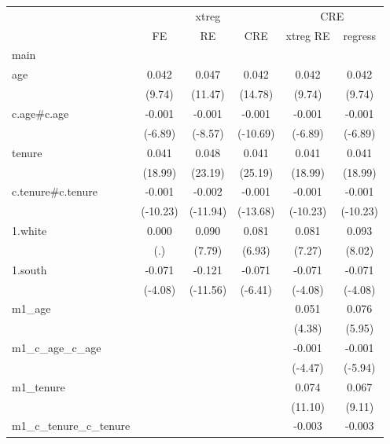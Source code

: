 
\begin{tabular}{l*{5}{c}}
\hline\hline
&\multicolumn{3}{c}{xtreg}&\multicolumn{2}{c}{CRE}\\
 & FE& RE& CRE &xtreg RE& regress\\

\hline
main        &            &            &            &            &            \\
age         &       0.042&       0.047&       0.042&       0.042&       0.042\\
            &      (9.74)&     (11.47)&     (14.78)&      (9.74)&      (9.74)\\
c.age\#c.age &      -0.001&      -0.001&      -0.001&      -0.001&      -0.001\\
            &     (-6.89)&     (-8.57)&    (-10.69)&     (-6.89)&     (-6.89)\\
tenure      &       0.041&       0.048&       0.041&       0.041&       0.041\\
            &     (18.99)&     (23.19)&     (25.19)&     (18.99)&     (18.99)\\
c.tenure\#c.tenure&      -0.001&      -0.002&      -0.001&      -0.001&      -0.001\\
            &    (-10.23)&    (-11.94)&    (-13.68)&    (-10.23)&    (-10.23)\\
1.white     &       0.000&       0.090&       0.081&       0.081&       0.093\\
            &         (.)&      (7.79)&      (6.93)&      (7.27)&      (8.02)\\
1.south     &      -0.071&      -0.121&      -0.071&      -0.071&      -0.071\\
            &     (-4.08)&    (-11.56)&     (-6.41)&     (-4.08)&     (-4.08)\\
m1\_age      &            &            &            &       0.051&       0.076\\
            &            &            &            &      (4.38)&      (5.95)\\
m1\_c\_age\_c\_age&            &            &            &      -0.001&      -0.001\\
            &            &            &            &     (-4.47)&     (-5.94)\\
m1\_tenure   &            &            &            &       0.074&       0.067\\
            &            &            &            &     (11.10)&      (9.11)\\
m1\_c\_tenure\_c\_tenure&            &            &            &      -0.003&      -0.003\\

\end{tabular}
